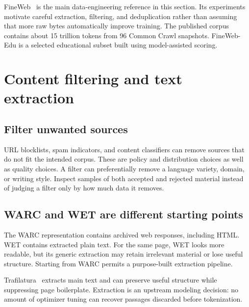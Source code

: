 FineWeb~\cite{fineweb} is the main data-engineering reference in this section. Its experiments motivate careful extraction, filtering, and deduplication rather than assuming that more raw bytes automatically improve training. The published corpus contains about 15 trillion tokens from 96 Common Crawl snapshots. FineWeb-Edu is a selected educational subset built using model-assisted scoring.


\section{Content filtering and text extraction}
\subsection{Filter unwanted sources}
URL blocklists, spam indicators, and content classifiers can remove sources that do not fit the intended corpus. These are policy and distribution choices as well as quality choices. A filter can preferentially remove a language variety, domain, or writing style. Inspect samples of both accepted and rejected material instead of judging a filter only by how much data it removes.

\subsection{WARC and WET are different starting points}
The WARC representation contains archived web responses, including HTML. WET contains extracted plain text. For the same page, WET looks more readable, but its generic extraction may retain irrelevant material or lose useful structure. Starting from WARC permits a purpose-built extraction pipeline.


Trafilatura~\cite{trafilatura} extracts main text and can preserve useful structure while suppressing page boilerplate. Extraction is an upstream modeling decision: no amount of optimizer tuning can recover passages discarded before tokenization.

